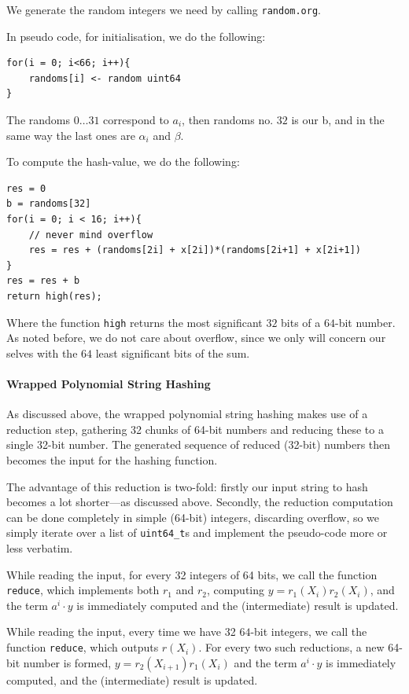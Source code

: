 \documentclass[]{article}
\newcommand{\funk}[1]{\small\texttt{#1}}
\begin{document}
We generate the random integers we need by calling \texttt{random.org}. 

In pseudo code, for initialisation, we do the following:

\begin{verbatim}
for(i = 0; i<66; i++){
    randoms[i] <- random uint64
}
\end{verbatim}

The randoms $0\ldots 31$ correspond to $a_i$, then randoms no. $32$ is our b, and in the same way the last ones are $\alpha_i$ and $\beta$.

To compute the hash-value, we do the following:
\begin{verbatim}
res = 0
b = randoms[32]
for(i = 0; i < 16; i++){
    // never mind overflow
    res = res + (randoms[2i] + x[2i])*(randoms[2i+1] + x[2i+1])
}
res = res + b
return high(res);
\end{verbatim}

Where the function \texttt{high} returns the most significant $32$ bits of a $64$-bit number.
As noted before, we do not care about overflow, since we only will concern our selves with the $64$ least significant bits of the sum.

\paragraph{Wrapped Polynomial String Hashing}

As discussed above, the wrapped polynomial string hashing makes use of a
reduction step, gathering 32 chunks of 64-bit numbers and reducing these to a
single 32-bit number. The generated sequence of reduced (32-bit) numbers then
becomes the input for the hashing function.

The advantage of this reduction is two-fold: firstly our input string to hash
becomes a lot shorter---as discussed above. Secondly, the reduction computation
can be done completely in simple (64-bit) integers, discarding overflow, so we
simply iterate over a list of \funk{uint64\_t}s and implement the pseudo-code more or less verbatim.

While reading the input, for every 32 integers of 64 bits, we call the function
\funk{reduce}, which implements both $r_1$ and $r_2$, computing $y =
r_1(X_i)r_2(X_i)$, and the term $a^i \cdot y$ is immediately computed and the (intermediate) result is updated.

While reading the input, every time we have 32 $64$-bit integers, we call the function \funk{reduce}, which outputs $r(X_i)$. For every two such reductions, a new 64-bit number is formed, $y = r_2(X_{i+1})r_1(X_i)$ and the term $a^i \cdot y$ is immediately computed, and the (intermediate) result is updated.
\end{document}

